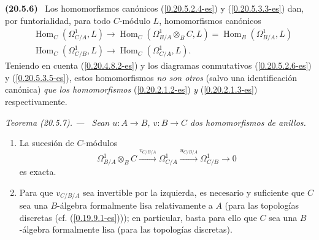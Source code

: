 \documentclass[10pt,oneside]{book}
\makeatletter
\newcommand{\sref}[1]{\textup{(\ref{#1})}}
\newcommand{\setmanualcurrentlabel}[1]{\def\@currentlabel{#1}}
\newenvironment{env}[1][]{\setmanualcurrentlabel{#1}\par\medskip\noindent\textbf{(#1)}\ }{\par}
\newenvironment{theorem}[1][]{%
  \setmanualcurrentlabel{#1}\par\medskip\noindent\itshape Teorema (#1). ---\ }{\par}
\makeatother
\begin{document}
\begin{env}[20.5.6]
\label{0.20.5.6-es}
Los homomorfismos canónicos \sref{0.20.5.2.4-es} y
\sref{0.20.5.3.3-es} dan, por funtorialidad, para todo $C$-módulo $L$,
homomorfismos canónicos
\begin{align}
\tag{20.5.6.1}
\label{0.20.5.6.1-es}
  &\operatorname{Hom}_C(\Omega^1_{C/A},L)
  \to\operatorname{Hom}_C(\Omega^1_{B/A}\otimes_B C,L)
  =\operatorname{Hom}_B(\Omega^1_{B/A},L) \\
\tag{20.5.6.2}
\label{0.20.5.6.2-es}
  &\operatorname{Hom}_C(\Omega^1_{C/B},L)
  \to\operatorname{Hom}_C(\Omega^1_{C/A},L).
\end{align}
Teniendo en cuenta \sref{0.20.4.8.2-es} y los diagramas conmutativos
\sref{0.20.5.2.6-es} y \sref{0.20.5.3.5-es}, estos homomorfismos \emph{no son
otros} (salvo una identificación canónica) \emph{que los homomorfismos}
\sref{0.20.2.1.2-es} \emph{y} \sref{0.20.2.1.3-es} respectivamente.
\end{env}

\begin{theorem}[20.5.7]
\label{0.20.5.7-es}
Sean $u:A\to B$, $v:B\to C$ dos homomorfismos de anillos.
\begin{enumerate}
  \item[\rm(i)] La sucesión de $C$-módulos
\begin{equation}
\tag{20.5.7.1}
\label{0.20.5.7.1-es}
  \Omega^1_{B/A}\otimes_B C
  \xrightarrow{v_{C/B/A}}\Omega^1_{C/A}
  \xrightarrow{u_{C/B/A}}\Omega^1_{C/B}\to0
\end{equation}
es exacta.
  \item[\rm(ii)] Para que $v_{C/B/A}$ sea invertible por la izquierda, es
  necesario y suficiente que $C$ sea una $B$-álgebra formalmente lisa relativamente a
  $A$ (para las topologías discretas \textup{(cf. \sref{0.19.9.1-es})}); en
  particular, basta para ello que $C$ sea una $B$-álgebra formalmente
  lisa (para las topologías discretas).
\end{enumerate}
\end{theorem}
\end{document}
